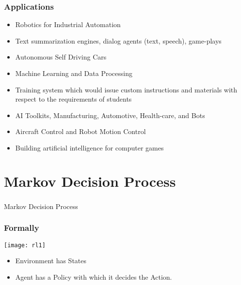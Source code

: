\begin{frame}[fragile]\frametitle{Applications}

\begin{itemize}
\item Robotics for Industrial Automation
\item Text summarization engines, dialog agents (text, speech), game-plays
\item Autonomous Self Driving Cars
\item Machine Learning and Data Processing
\item Training system which would issue custom instructions and materials with respect to the requirements of students
\item AI Toolkits, Manufacturing, Automotive, Health-care, and Bots
\item Aircraft Control and Robot Motion Control
\item Building artificial intelligence for computer games
\end{itemize}

\end{frame}

\section[MDP]{Markov Decision Process}

\begin{frame}[fragile]\frametitle{}
\begin{center}
{\Large Markov Decision Process}
\end{center}
\end{frame}



\begin{frame}[fragile]\frametitle{Formally}
\begin{center}
\texttt{[image: rl1]}
\end{center}

\begin{itemize}
\item Environment has States
\item Agent has a Policy with which it decides the Action.
\end{itemize}
\end{frame}

